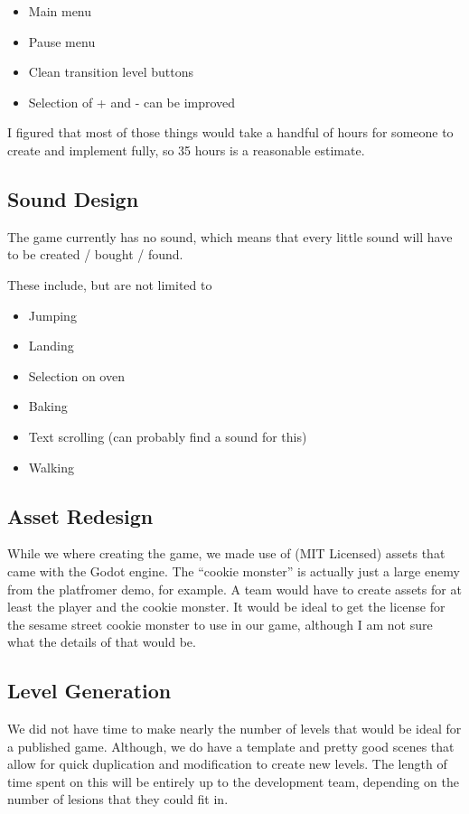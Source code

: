 \documentclass{article}
\begin{document}
\begin{itemize}
  \item Main menu
  \item Pause menu
  \item Clean transition level buttons
  \item Selection of + and - can be improved
\end{itemize}

I figured that most of those things would take a handful of hours for
someone to create and implement fully, so 35 hours is a reasonable
estimate.

\subsection{Sound Design}

The game currently has no sound, which means that every little sound
will have to be created / bought / found.

These include, but are not limited to

\begin{itemize}
  \item Jumping
  \item Landing
  \item Selection on oven
  \item Baking
  \item Text scrolling (can probably find a sound for this)
  \item Walking
\end{itemize}

\subsection{Asset Redesign}

While we where creating the game, we made use of (MIT Licensed) assets
that came with the Godot engine. The ``cookie monster'' is actually
just a large enemy from the platfromer demo, for example. A team would
have to create assets for at least the player and the cookie
monster. It would be ideal to get the license for the sesame street
cookie monster to use in our game, although I am not sure what the
details of that would be.

\subsection{Level Generation}

We did not have time to make nearly the number of levels that would be
ideal for a published game. Although, we do have a template and pretty
good scenes that allow for quick duplication and modification to
create new levels. The length of time spent on this will be entirely
up to the development team, depending on the number of lesions that
they could fit in.
\end{document}
